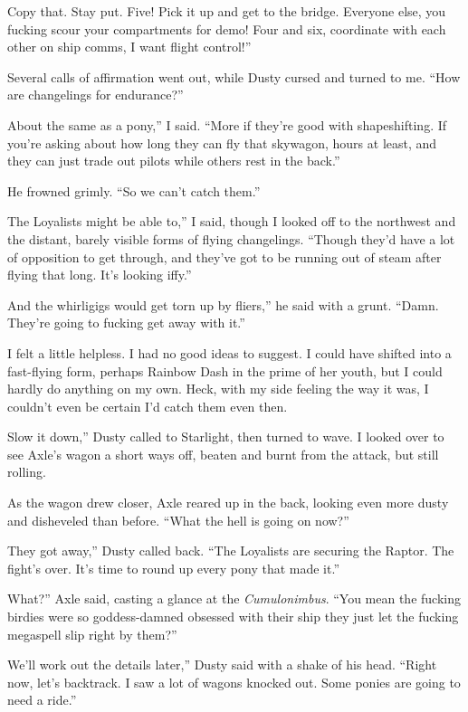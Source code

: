 \leavevmode{}Copy that. Stay put. Five! Pick it up and get to the bridge. Everyone else, you fucking scour your compartments for demo! Four and six, coordinate with each other on ship comms, I want flight control!”

Several calls of affirmation went out, while Dusty cursed and turned to me. “How are changelings for endurance?”

\leavevmode{}About the same as a pony,” I said. “More if they’re good with shapeshifting. If you’re asking about how long they can fly that skywagon, hours at least, and they can just trade out pilots while others rest in the back.”

He frowned grimly. “So we can’t catch them.”

\leavevmode{}The Loyalists might be able to,” I said, though I looked off to the northwest and the distant, barely visible forms of flying changelings. “Though they’d have a lot of opposition to get through, and they’ve got to be running out of steam after flying that long. It’s looking iffy.”

\leavevmode{}And the whirligigs would get torn up by fliers,” he said with a grunt. “Damn. They’re going to fucking get away with it.”

I felt a little helpless. I had no good ideas to suggest. I could have shifted into a fast-flying form, perhaps Rainbow Dash in the prime of her youth, but I could hardly do anything on my own. Heck, with my side feeling the way it was, I couldn’t even be certain I’d catch them even then.

\leavevmode{}Slow it down,” Dusty called to Starlight, then turned to wave. I looked over to see Axle’s wagon a short ways off, beaten and burnt from the attack, but still rolling.

As the wagon drew closer, Axle reared up in the back, looking even more dusty and disheveled than before. “What the hell is going on now?”

\leavevmode{}They got away,” Dusty called back. “The Loyalists are securing the Raptor. The fight’s over. It’s time to round up every pony that made it.”

\leavevmode{}What?” Axle said, casting a glance at the \textit{Cumulonimbus}. “You mean the fucking birdies were so goddess-damned obsessed with their ship they just let the fucking megaspell slip right by them?”

\leavevmode{}We’ll work out the details later,” Dusty said with a shake of his head. “Right now, let’s backtrack. I saw a lot of wagons knocked out. Some ponies are going to need a ride.”

